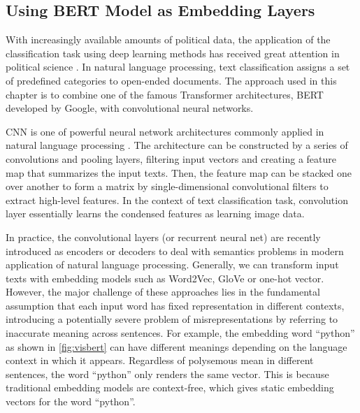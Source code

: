 

\subsection*{Using BERT Model as Embedding Layers}

With increasingly available amounts of political data, the application of the classification task using deep learning methods has received great attention in political science \citep{Chatsiou2020}. In natural language processing, text classification assigns a set of predefined categories to open-ended documents. The approach used in this chapter is to combine one of the famous Transformer architectures, BERT developed by Google, with convolutional neural networks. 

CNN is one of powerful neural network architectures commonly applied in natural language processing \citep{Zhang2015, Zhang2020, Kim2014, Kim2016}. The architecture can be constructed by a series of convolutions and pooling layers, filtering input vectors and creating a feature map that summarizes the input texts. Then, the feature map can be stacked one over another to form a matrix by single-dimensional convolutional filters to extract high-level features. In the context of text classification task, convolution layer essentially learns the condensed features as learning image data. 



In practice, the convolutional layers (or recurrent neural net) are recently introduced as encoders or decoders to deal with semantics problems in modern application of natural language processing. Generally, we can transform input texts with embedding models such as Word2Vec, GloVe or one-hot vector. However, the major challenge of these approaches lies in the fundamental assumption that each input word has fixed representation in different contexts, introducing a potentially severe problem of misrepresentations by referring to inaccurate meaning across sentences. For example, the embedding word ``python'' as shown in \autoref{fig:visbert} can have different meanings depending on the language context in which it appears. Regardless of polysemous mean in different sentences, the word ``python'' only renders the same vector. This is because traditional embedding models are context-free, which gives static embedding vectors for the word ``python''. 

